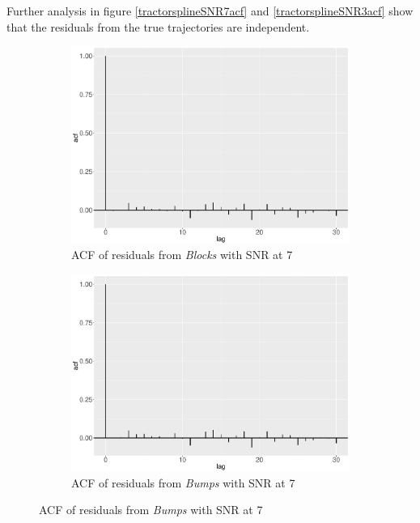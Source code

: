 Further analysis in figure \ref{tractorsplineSNR7acf} and \ref{tractorsplineSNR3acf} show that the residuals from the true trajectories are independent. 
\begin{figure}
    \centering
    \begin{subfigure}{0.45\textwidth}
    \centering
    \includegraphics[width=\textwidth]{Chapters/02TractorSplineTheory/plot/ggplot/ggacfBlocks7.pdf}
    \caption{ACF of residuals from \textit{Blocks} with SNR at 7 }
    \end{subfigure}%
    \begin{subfigure}{0.45\textwidth}
    \centering
    \includegraphics[width=\textwidth]{Chapters/02TractorSplineTheory/plot/ggplot/ggacfBumps7.pdf}
    \caption{ACF of residuals from \textit{Bumps} with SNR at 7 }
    \end{subfigure}

\end{figure}
